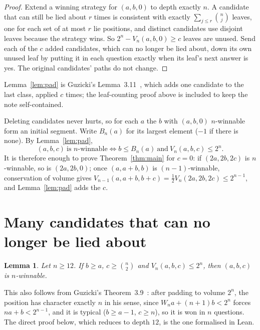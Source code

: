 \documentclass[11pt]{amsart}
\newtheorem{lemma}[thm]{Lemma}
\theoremstyle{definition}
\begin{document}
\begin{proof}
Extend a winning strategy for $(a,b,0)$ to depth exactly $n$. A candidate that can still be lied about $r$ times is
consistent with exactly $\sum_{j\le r}\binom nj$ leaves, one for each set of at most $r$ lie positions, and distinct
candidates use disjoint leaves because the strategy wins. So $2^n-V_n(a,b,0)\ge c$ leaves are unused. Send each of
the $c$ added candidates, which can no longer be lied about, down its own unused leaf by putting it in each question
exactly when its leaf's next answer is yes. The original candidates' paths do not change.
\end{proof}

\noindent Lemma~\ref{lem:pad} is Guzicki's Lemma~3.11~\cite{Guzicki}, which adds one candidate to the last class,
applied $c$ times; the leaf-counting proof above is included to keep the note self-contained.

Deleting candidates never hurts, so for each $a$ the $b$ with $(a,b,0)$ $n$-winnable form an initial segment. Write
$B_n(a)$ for its largest element ($-1$ if there is none). By Lemma~\ref{lem:pad},
\begin{equation}\label{eq:frontier}
(a,b,c)\ \text{is $n$-winnable}\iff b\le B_n(a)\ \text{and}\ V_n(a,b,c)\le2^n .
\end{equation}
It is therefore enough to prove Theorem~\ref{thm:main} for $c=0$: if $(2a,2b,2c)$ is $n$-winnable, so is $(2a,2b,0)$;
once $(a,a+b,b)$ is $(n-1)$-winnable, conservation of volume gives $V_{n-1}(a,a+b,b+c)=\tfrac12V_n(2a,2b,2c)\le2^{n-1}$,
and Lemma~\ref{lem:pad} adds the $c$.

\section{Many candidates that can no longer be lied about}\label{sec:lem2}

\begin{lemma}\label{lem:many}
Let $n\ge12$. If $b\ge a$, $c\ge\binom n2$ and $V_n(a,b,c)\le2^n$, then $(a,b,c)$ is $n$-winnable.
\end{lemma}

\noindent This also follows from Guzicki's Theorem~3.9~\cite{Guzicki}: after padding to volume $2^n$, the position
has character exactly $n$ in his sense, since $W_na+(n+1)b<2^n$ forces $na+b<2^{n-1}$, and it is typical
($b\ge a-1$, $c\ge n$), so it is won in $n$ questions. The direct proof below, which reduces to depth $12$, is the
one formalised in Lean.
\end{document}
